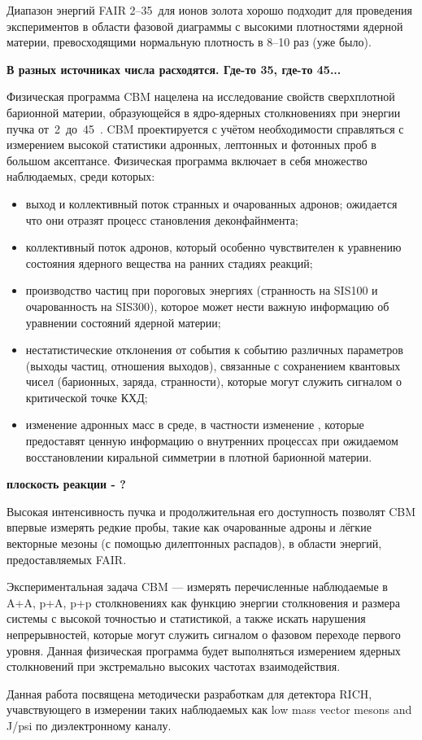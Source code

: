 Диапазон энергий FAIR 2--35~\GeVperNucl для ионов золота хорошо подходит для проведения экспериментов в области фазовой диаграммы с высокими плотностями ядерной материи, превосходящими нормальную плотность в 8--10 раз (уже было).

\todo \textbf{В разных источниках числа расходятся. Где-то 35, где-то 45...}

Физическая программа CBM нацелена на исследование свойств сверхплотной барионной материи, образующейся в ядро-ядерных столкновениях при энергии пучка от~2~до~45~\GeVperNucl. CBM проектируется с учётом необходимости справляться с измерением высокой статистики адронных, лептонных и фотонных проб в большом аксептансе. Физическая программа включает в себя множество наблюдаемых, среди которых:

\begin{itemize}
\item выход и коллективный поток странных и очарованных адронов; ожидается что они отразят процесс становления деконфайнмента;
\item коллективный поток адронов, который особенно чувствителен к уравнению состояния ядерного вещества на ранних стадиях реакций;
\item производство частиц при пороговых энергиях (странность на SIS100 и очарованность на SIS300), которое может нести важную информацию об уравнении состояний ядерной материи;
\item нестатистические отклонения от события к событию различных параметров (выходы частиц, отношения выходов), связанные с сохранением квантовых чисел (барионных, заряда, странности), которые могут служить сигналом о критической точке КХД;
\item изменение адронных масс в среде, в частности изменение \todo, которые предоставят ценную информацию о внутренних процессах при ожидаемом восстановлении киральной симметрии в плотной барионной материи.
\end{itemize}

\todo \textbf{плоскость реакции - ?}

Высокая интенсивность пучка и продолжительная его доступность позволят CBM впервые измерять редкие пробы, такие как очарованные адроны и лёгкие векторные мезоны (с помощью дилептонных распадов), в области энергий, предоставляемых FAIR.

Экспериментальная задача CBM --- измерять перечисленные наблюдаемые в A+A, p+A, p+p столкновениях как функцию энергии столкновения и размера системы с высокой точностью и статистикой, а также искать нарушения непрерывностей, которые могут служить сигналом о фазовом переходе первого уровня. Данная физическая программа будет выполняться измерением ядерных столкновений при экстремально высоких частотах взаимодействия.

Данная работа посвящена методически разработкам для детектора RICH, учавствующего в измерении таких наблюдаемых как low mass vector mesons and J/psi по диэлектронному каналу.









